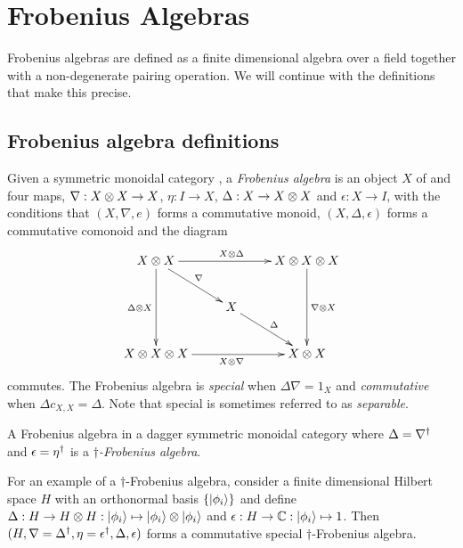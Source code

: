 \section{Frobenius Algebras} %
\label{sec:frobenius_algebras}
Frobenius algebras are defined as a finite dimensional algebra over a field together with a
non-degenerate pairing operation. We will continue with the definitions that make this precise.

\subsection{Frobenius algebra definitions} %
\label{sub:frobenius_algebra_definitions}


\begin{definition}\label{def:frobeniusalgebra}
  Given a symmetric monoidal category \cD, a \emph{Frobenius algebra} is an object $X$ of \cD and
  four maps, $\nabla :X\otimes X \to X$, $\eta: I \to X$, $\Delta: X\to X\otimes X$ and $\epsilon:X\to I$, with
  the conditions that $(X,\nabla,e)$ forms a commutative monoid, $(X,\Delta, \epsilon)$ forms a
  commutative comonoid and the diagram
  \[
    \xymatrix{
      X\*X \ar[rr]^{X\*\Delta} \ar[dd]_{\Delta \* X} \ar[dr]^{\nabla}
        && X\*X\*X \ar[dd]^{\nabla\*X}\\
      & X\ar[dr]^{\Delta}\\
      X\*X\*X\ar[rr]_{X\*\nabla}  && X\*X
    }
  \]
  commutes. The Frobenius algebra is \emph{special} when $\Delta \nabla = 1_{X}$ and
  \emph{commutative} when $\Delta c_{X,X} = \Delta$. Note that special is sometimes referred to as
  \emph{separable}.
\end{definition}
\begin{definition}\label{def:daggerfrob}
  A Frobenius algebra in a dagger symmetric monoidal category where $\Delta = {\nabla}^{\dagger}$ and
  $\epsilon={\eta}^{\dagger}$ is a $\dagger$\emph{-Frobenius algebra}.
\end{definition}
For an example of a $\dagger$-Frobenius algebra, consider a finite dimensional Hilbert space $H$
with an orthonormal basis $\{\left\vert{\phi_{i}}\right\rangle\}$ and define $\Delta:H\to H\otimes H: \left\vert{\phi_{i}}\right\rangle\mapsto
\left\vert{\phi_{i}}\right\rangle \otimes \left\vert{\phi_{i}}\right\rangle$ and $\epsilon : H\to \mathbb{C} : \left\vert{\phi_{i}}\right\rangle \mapsto 1$. Then $(H,
\nabla={\Delta}^{\dagger}, \eta={\epsilon}^{\dagger}, \Delta, \epsilon)$ forms a commutative special
$\dagger$-Frobenius algebra.


